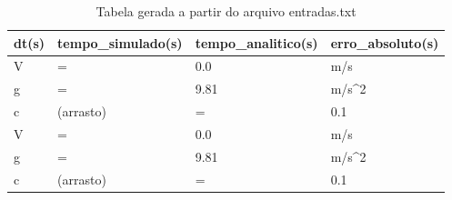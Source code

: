 \begin{table}
\caption{Tabela gerada a partir do arquivo entradas.txt}
\label{tab:entradas}
\begin{tabular}{llll}
\toprule
dt(s) & tempo_simulado(s) & tempo_analitico(s) & erro_absoluto(s) \\
\midrule
V & = & 0.0 & m/s \\
g & = & 9.81 & m/s^2 \\
c & (arrasto) & = & 0.1 \\
V & = & 0.0 & m/s \\
g & = & 9.81 & m/s^2 \\
c & (arrasto) & = & 0.1 \\
\bottomrule
\end{tabular}
\end{table}
